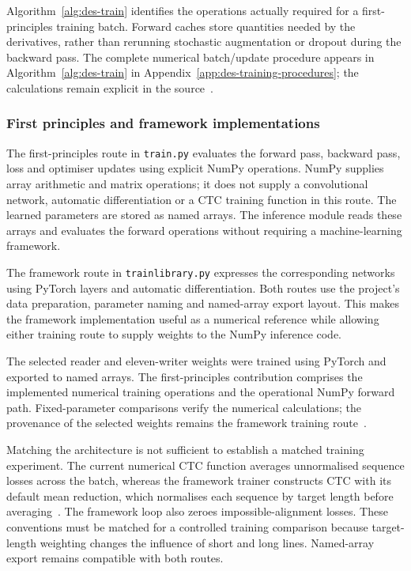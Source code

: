 Algorithm~\ref{alg:des-train} identifies the operations actually required for a first-principles training batch. Forward caches store quantities needed by the derivatives, rather than rerunning stochastic augmentation or dropout during the backward pass.
The complete numerical batch/update procedure appears in Algorithm~\ref{alg:des-train} in Appendix~\ref{app:des-training-procedures}; the calculations remain explicit in the source~\cite[train.py]{braunepipeline2026}.

\subsubsection{First principles and framework implementations}
\label{sec:des-implementations}
The first-principles route in \texttt{train.py} evaluates the forward pass, backward pass, loss and optimiser updates using explicit NumPy operations. NumPy supplies array arithmetic and matrix operations; it does not supply a convolutional network, automatic differentiation or a CTC training function in this route. The learned parameters are stored as named arrays. The inference module reads these arrays and evaluates the forward operations without requiring a machine-learning framework.~\cite[recognise.py; train.py; trainlibrary.py]{braunepipeline2026}


The framework route in \texttt{trainlibrary.py} expresses the corresponding networks using PyTorch layers and automatic differentiation. Both routes use the project's data preparation, parameter naming and named-array export layout. This makes the framework implementation useful as a numerical reference while allowing either training route to supply weights to the NumPy inference code.~\cite[recognise.py; train.py; trainlibrary.py]{braunepipeline2026}

The selected reader and eleven-writer weights were trained using PyTorch and exported to named arrays. The first-principles contribution comprises the implemented numerical training operations and the operational NumPy forward path. Fixed-parameter comparisons verify the numerical calculations; the provenance of the selected weights remains the framework training route~\cite[training records]{brauneevidence2026}\cite[recognise.py; train.py; trainlibrary.py]{braunepipeline2026}.

Matching the architecture is not sufficient to establish a matched training experiment. The current numerical CTC function averages unnormalised sequence losses across the batch, whereas the framework trainer constructs CTC with its default mean reduction, which normalises each sequence by target length before averaging~\cite[CTCLoss, ``Parameters'' ]{pytorchctc}. The framework loop also zeroes impossible-alignment losses. These conventions must be matched for a controlled training comparison because target-length weighting changes the influence of short and long lines. Named-array export remains compatible with both routes.~\cite[recognise.py; train.py; trainlibrary.py]{braunepipeline2026}

